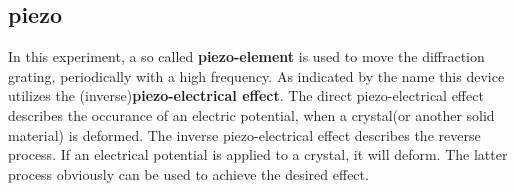 \subsection{piezo}
\label{subsec:}
In this experiment, a so called \textbf{piezo-element} is used to move the
diffraction grating, periodically with a high frequency.
As indicated by the name this device utilizes the (inverse)\textbf{piezo-electrical effect}.
The direct piezo-electrical effect describes the occurance of an electric potential,
when a crystal(or another solid material) is deformed. The inverse piezo-electrical effect describes
the reverse process. If an electrical potential is applied to a crystal, it will deform.
The latter process obviously can be used to achieve the desired effect.
